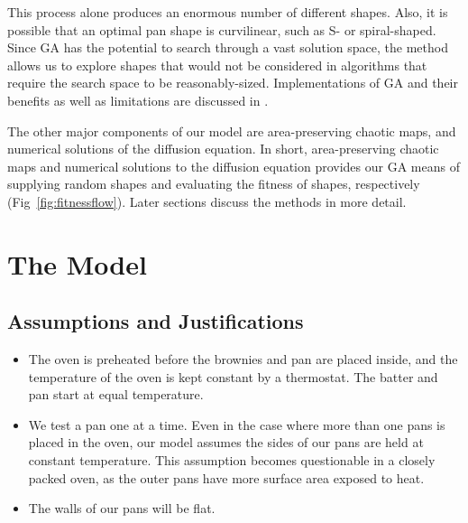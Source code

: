 \documentclass[12pt,draft]{reedmcm}
\begin{document}
This process alone produces an enormous number of different shapes.
Also, it is possible that an optimal pan shape is curvilinear, such as S- or spiral-shaped.
Since GA has the potential to search through a vast solution space, the method allows us to explore shapes that would not be considered in algorithms that require the search space to be reasonably-sized.
Implementations of GA and their benefits as well as limitations are discussed in \citet{mitchell}.

The other major components of our model are area-preserving chaotic maps, and numerical solutions of the diffusion equation.
In short, area-preserving chaotic maps and numerical solutions to the diffusion equation provides our GA means of supplying random shapes and evaluating the fitness of shapes, respectively (Fig~\ref{fig:fitnessflow}).
Later sections discuss the methods in more detail.

\section{The Model}
\subsection{Assumptions and Justifications}
\begin{itemize}
  \item The oven is preheated before the brownies and pan are placed inside, and the temperature of the oven is kept constant by a thermostat. The batter and pan start at equal temperature.

  \item We test a pan one at a time. 
  Even in the case where more than one pans is placed in the oven, our model assumes the sides of our pans are held at constant temperature.  This assumption becomes questionable in a closely packed oven, as the outer pans have more surface area exposed to heat.

  \item The walls of our pans will be flat.
\end{itemize}
\end{document}
